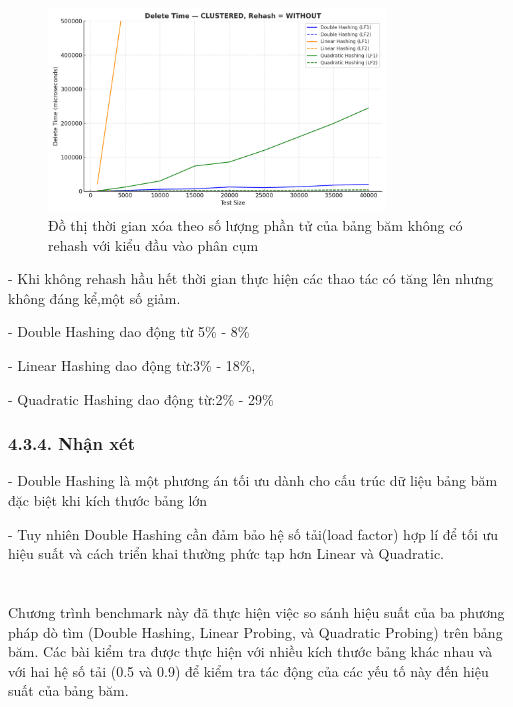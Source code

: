 \documentclass[12pt,a4paper]{report}
\begin{document}
\begin{figure}[!ht]
    \centering
    \includegraphics[width=0.8\textwidth]{clus_del_not.png}
    \caption{Đồ thị thời gian xóa theo số lượng phần tử của bảng băm không có rehash với kiểu đầu vào phân cụm}
    \label{fig:flowchart}
\end{figure}

-	Khi không rehash hầu hết thời gian thực hiện các thao tác có tăng lên nhưng không đáng kể,một số giảm.

-	Double Hashing dao động từ 5\% - 8\%

-	Linear Hashing dao động từ:3\% - 18\%,

-	Quadratic Hashing dao động từ:2\% - 29\%

\subsection*{4.3.4. Nhận xét}
\noindent \indent - Double Hashing là một phương án tối ưu dành cho cấu trúc dữ liệu bảng băm đặc biệt khi kích thước bảng lớn

    - Tuy nhiên Double Hashing cần đảm bảo hệ số tải(load factor) hợp lí để tối ưu hiệu suất và cách triển khai thường phức tạp hơn Linear và Quadratic.




\newpage
\chapter*{}
\noindent \indent Chương trình benchmark này đã thực hiện việc so sánh hiệu suất của ba phương pháp dò tìm (Double Hashing, Linear Probing, và Quadratic Probing) trên bảng băm. Các bài kiểm tra được thực hiện với nhiều kích thước bảng khác nhau và với hai hệ số tải (0.5 và 0.9) để kiểm tra tác động của các yếu tố này đến hiệu suất của bảng băm.
\end{document}
